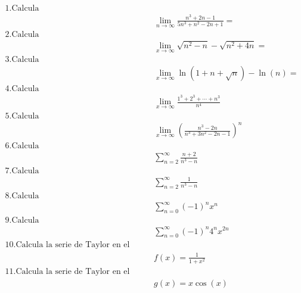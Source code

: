 \documentclass{article}
\begin{document}
\begin{align*}
\text{1.Calcula}\\
&\lim_{n \to \infty}\frac{n^3+2n-1}{5n^3+n^2-2n+1}=\\
\text{2.Calcula}\\
&\lim_{x \to \infty}\sqrt{n^2-n}-\sqrt{n^2+4n} =\\
\text{3.Calcula}\\
&\lim_{x \to \infty}\ln(1+n+\sqrt{n})-\ln(n)=\\
\text{4.Calcula}\\
&\lim_{x \to \infty}\frac{1^3+2^3+\cdots+n^3}{n^4} \\
\text{5.Calcula}\\
&\lim_{x \to \infty}{\left(\frac{n^3-2n}{n^3+3n^2-2n-1}\right)}^n  \\
\text{6.Calcula}\\
&\sum_{n = 2}^{\infty}\frac{n+2}{n^3-n}\\
\text{7.Calcula}\\
&\sum_{n = 2}^{\infty}\frac{1}{n^3-n}\\
\text{8.Calcula}\\
&\sum_{n = 0}^{\infty}{(-1)}^n{x^n}\\
\text{9.Calcula}\\
&\sum_{n = 0}^{\infty}{(-1)}^n{4^n}{x^{2n}}\\
\text{10.Calcula la serie de Taylor en el orígen de la funcion}\\
&f{(x)}=\frac{1}{1+x^2}\\
\text{11.Calcula la serie de Taylor en el orígen de la funcion}\\
&g{(x)}=x\cos(x)
\end{align*}
\end{document}
